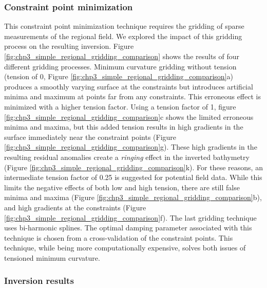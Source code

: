 \subsubsection{Constraint point minimization}

This constraint point minimization technique requires the gridding of sparse measurements of the regional field. We explored the impact of this gridding process on the resulting inversion. Figure \ref{fig:chp3_simple_regional_gridding_comparison} shows the results of four different gridding processes. Minimum curvature gridding without tension (tension of 0, Figure \ref{fig:chp3_simple_regional_gridding_comparison}a) produces a smoothly varying surface at the constraints but introduces artificial minima and maximum at points far from any constraints. This erroneous effect is minimized with a higher tension factor. Using a tension factor of 1, figure \ref{fig:chp3_simple_regional_gridding_comparison}c shows the limited erroneous minima and maxima, but this added tension results in high gradients in the surface immediately near the constraint points (Figure \ref{fig:chp3_simple_regional_gridding_comparison}g). These high gradients in the resulting residual anomalies create a \textit{ringing} effect in the inverted bathymetry (Figure \ref{fig:chp3_simple_regional_gridding_comparison}k). For these reasons, an intermediate tension factor of 0.25 is suggested for potential field data. While this limits the negative effects of both low and high tension, there are still false minima and maxima (Figure \ref{fig:chp3_simple_regional_gridding_comparison}b), and high gradients at the constraints (Figure \ref{fig:chp3_simple_regional_gridding_comparison}f). The last gridding technique uses bi-harmonic splines. The optimal damping parameter associated with this technique is chosen from a cross-validation of the constraint points. This technique, while being more computationally expensive, solves both issues of tensioned minimum curvature. 

\subsubsection{Inversion results}

